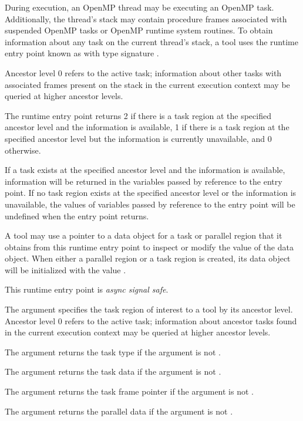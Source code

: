 \descr
During execution, an OpenMP thread may be executing an OpenMP task.
Additionally, the thread's stack may contain
procedure frames associated with suspended OpenMP tasks or
OpenMP runtime system routines.
To obtain information about any task on the current thread's stack,
a tool uses the runtime entry point known as
with type signature .

Ancestor level 0 refers to the active task; information about
other tasks with associated frames present on the stack in the current execution context may be queried at
higher ancestor levels.

The  runtime entry point
returns 2 if there is a task region at the
specified ancestor level
and the information is available, 1 if there is a task region at the
specified ancestor level but the information is currently unavailable,
and 0 otherwise.

If a task exists at the specified ancestor level and the information is available,
information will be returned in the variables passed by reference to the entry
point.  If no task region exists at the specified ancestor level
or the information is unavailable,
the values of variables passed by reference to the entry point will be
undefined when the entry point returns.

A tool may use a pointer to a data object for a task or parallel
region that it obtains from this runtime entry point to inspect or modify the
value of the data object.  When either a parallel region or a task
region is created, its data object will be initialized with the value
.

This runtime entry point is \emph{async signal safe}.

\argdesc

The argument  specifies the task region
of interest to a tool by its ancestor level.  Ancestor level 0 refers
to the active task; information about
ancestor tasks found in the current execution context may be queried at
higher ancestor levels.

The argument  returns the task type
if the argument is not .

The argument  returns the task data
if the argument is not .

The argument  returns the task frame
pointer
if the argument is not .

The argument  returns the parallel data
if the argument is not .

